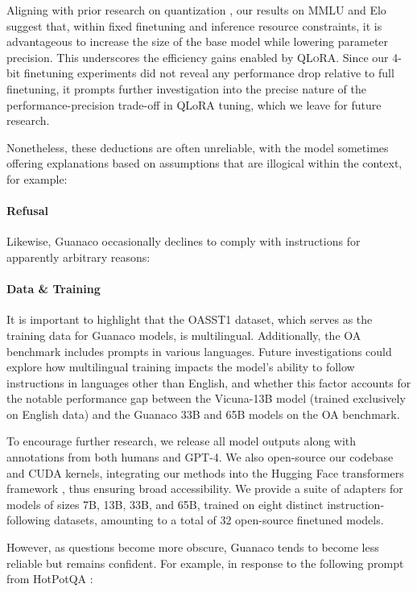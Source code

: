 Aligning with prior research on quantization \citep{dettmers2022case}, our results on MMLU and Elo suggest that, within fixed finetuning and inference resource constraints, it is advantageous to increase the size of the base model while lowering parameter precision. This underscores the efficiency gains enabled by \textsc{QLoRA}. Since our 4-bit finetuning experiments did not reveal any performance drop relative to full finetuning, it prompts further investigation into the precise nature of the performance-precision trade-off in QLoRA tuning, which we leave for future research.

Nonetheless, these deductions are often unreliable, with the model sometimes offering explanations based on assumptions that are illogical within the context, for example:

\paragraph{Refusal} Likewise, {Guanaco} occasionally declines to comply with instructions for apparently arbitrary reasons:

\paragraph{Data \& Training} It is important to highlight that the OASST1 dataset, which serves as the training data for {Guanaco} models, is multilingual. Additionally, the OA benchmark includes prompts in various languages. Future investigations could explore how multilingual training impacts the model's ability to follow instructions in languages other than English, and whether this factor accounts for the notable performance gap between the Vicuna-13B model (trained exclusively on English data) and the {Guanaco} 33B and 65B models on the OA benchmark.

To encourage further research, we release all model outputs along with annotations from both humans and GPT-4. We also open-source our codebase and CUDA kernels, integrating our methods into the Hugging Face transformers framework \citep{wolf2019huggingface}, thus ensuring broad accessibility. We provide a suite of adapters for models of sizes 7B, 13B, 33B, and 65B, trained on eight distinct instruction-following datasets, amounting to a total of 32 open-source finetuned models.

However, as questions become more obscure, {Guanaco} tends to become less reliable but remains confident. For example, in response to the following prompt from HotPotQA \citep{yang2018hotpotqa}:

